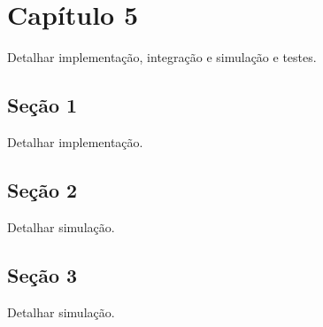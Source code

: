 \chapter{Capítulo 5}

\begin{guide}
	Detalhar implementação, integração e simulação e testes.
\end{guide}

\section{Seção 1}

\begin{guide}Detalhar implementação.\end{guide}

\section{Seção 2}

\begin{guide}Detalhar simulação.\end{guide}

\section{Seção 3}

\begin{guide}Detalhar simulação.\end{guide}
